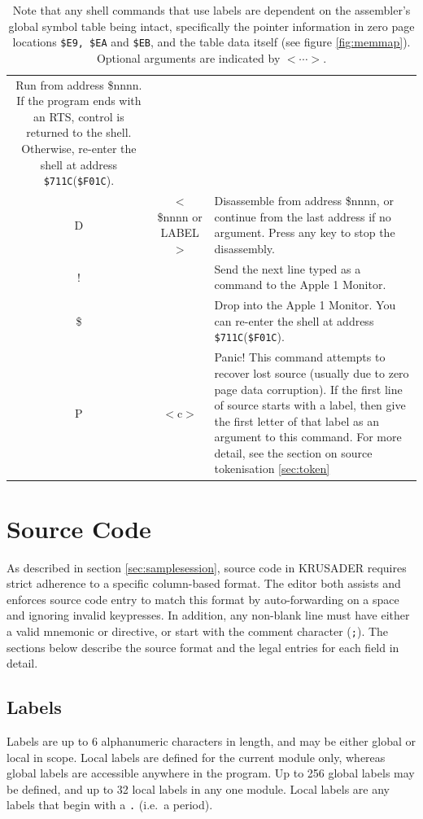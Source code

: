 \documentclass[12pt]{article}
\newcommand{\replica}[1]{\textsf{#1}}
\newcommand{\krusader}{\textsf{KRUSADER}\xspace}
\begin{document}
\begin{table}[p]
\begin{tabular}{|c|c|p{10cm}|}
									Run from address \replica{\$nnnn}.  If the
									program ends with an RTS, control is returned to the
									shell.  Otherwise, re-enter the shell at address
									\texttt{\$711C}(\texttt{\$F01C}).\tabularnewline
	\replica{D} & $<$\replica{\$nnnn} or \replica{LABEL}$>$ & Disassemble
									from address \replica{\$nnnn}, or continue from the last
									address if no argument. Press any key to stop the disassembly.\tabularnewline
	\replica{!} & & Send the next line typed as a command to the Apple 1 Monitor.\tabularnewline
	\replica{\$} & & Drop into the Apple 1 Monitor.  You can re-enter the shell at address
									\texttt{\$711C}(\texttt{\$F01C}).\tabularnewline
	\replica{P} & \replica{$<$c$>$} & Panic!  This command attempts to recover lost source
									(usually due to zero page data corruption).  If the first
									line of source starts with a label, then give the first
									letter of that label as an argument to this command.  For
									more detail, see the section on source tokenisation
									\ref{sec:token}\tabularnewline
	\hline
	\end{tabular}
	\caption{\krusader shell commands.}\caption*{Note that any shell commands that use labels
	are dependent on the assembler's global symbol table being intact, specifically the pointer information
	in zero page locations \texttt{\$E9, \$EA} and \texttt{\$EB}, and the table data itself (see
	figure \ref{fig:memmap}). 	Optional arguments are indicated by $<\cdots>$.}
	\label{tab:shellcmds}
\end{table}
\section{Source Code}

As described in section \ref{sec:samplesession}, source code in \krusader requires strict adherence to a specific column-based format.
The editor both assists and enforces source code entry to match this format by auto-forwarding on a space and ignoring invalid keypresses.  In addition, any non-blank line must have either a valid mnemonic or directive, or start with the comment character (\texttt{;}).  The sections below describe the source format and the legal entries for each field in detail.

\subsection{Labels}
\label{sec:labels}

Labels are up to 6 alphanumeric characters in length, and may be either global or local in scope.  Local labels are defined for the current module only, whereas global labels are accessible anywhere in the program.  Up to 256 global labels may be defined, and up to 32 local labels in any one module.  Local labels are any labels that begin with a \texttt{.} (i.e.~a period).
\end{document}
